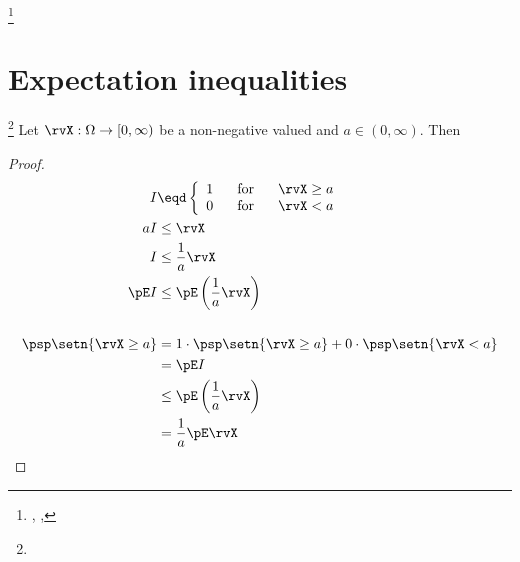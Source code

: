 \begin{theorem}
\footnote{
  ,
  ,
  }
\end{theorem}


\section{Expectation inequalities}
\begin{theorem}
\footnote{
  }
\label{thm:markovineq}
Let $\rvX:\Omega\to[0,\infty)$ be a non-negative valued  and
$a\in(0,\infty)$. Then
\end{theorem}
\begin{proof}
\begin{align*}
  I &\eqd \left\{ \begin{array}{l@{\hspace{4ex}\mbox{for}\hspace{4ex}}l}
    1 &\rvX\ge a \\
    0 &\rvX < a
    \end{array}\right.
\\
  aI &\le\rvX           \\
   I &\le \frac{1}{a}\rvX \\
   \pE I &\le \pE\left(\frac{1}{a}\rvX\right) \\
\\
   \psp\setn{\rvX\ge a}
     &= 1\cdot\psp\setn{\rvX\ge a} + 0\cdot\psp\setn{\rvX<a}
   \\&= \pE I
   \\&\le \pE\left(\frac{1}{a}\rvX \right)
   \\&=   \frac{1}{a}\pE\rvX
\end{align*}
\end{proof}

